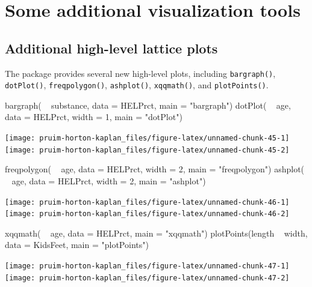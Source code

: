 \section{Some additional visualization
tools}\label{some-additional-visualization-tools}

\subsection{Additional high-level lattice
plots}\label{additional-high-level-lattice-plots}

The  package provides several new high-level 
plots, including \texttt{bargraph()}, \texttt{dotPlot()},
\texttt{freqpolygon()}, \texttt{ashplot()}, \texttt{xqqmath()}, and
\texttt{plotPoints()}.

\begin{Schunk}
\begin{Sinput}
bargraph( ~ substance, data = HELPrct, main = "bargraph")
dotPlot( ~ age, data = HELPrct, width = 1, main = "dotPlot")
\end{Sinput}


\begin{center}\texttt{[image: pruim-horton-kaplan\_files/figure-latex/unnamed-chunk-45-1]} \texttt{[image: pruim-horton-kaplan\_files/figure-latex/unnamed-chunk-45-2]} \end{center}

\end{Schunk}\begin{Schunk}
\begin{Sinput}
freqpolygon( ~ age, data = HELPrct, width = 2, main = "freqpolygon")
ashplot( ~ age, data = HELPrct, width = 2, main = "ashplot")
\end{Sinput}


\begin{center}\texttt{[image: pruim-horton-kaplan\_files/figure-latex/unnamed-chunk-46-1]} \texttt{[image: pruim-horton-kaplan\_files/figure-latex/unnamed-chunk-46-2]} \end{center}

\end{Schunk}\begin{Schunk}
\begin{Sinput}
xqqmath( ~ age, data = HELPrct, main = "xqqmath")
plotPoints(length ~ width, data = KidsFeet, main = "plotPoints")
\end{Sinput}


\begin{center}\texttt{[image: pruim-horton-kaplan\_files/figure-latex/unnamed-chunk-47-1]} \texttt{[image: pruim-horton-kaplan\_files/figure-latex/unnamed-chunk-47-2]} \end{center}

\end{Schunk}

